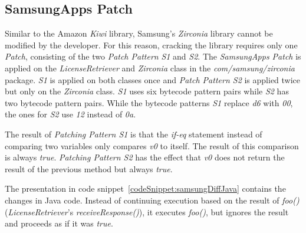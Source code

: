 \subsection{SamsungApps Patch}
Similar to the Amazon \textit{Kiwi} library, Samsung's \textit{Zirconia} library cannot be modified by the developer.
For this reason, cracking the library requires only one \textit{Patch}, consisting of the two \textit{Patch Pattern} \textit{S1} and \textit{S2}.
The \textit{SamsungApps Patch} is applied on the \textit{LicenseRetriever} and \textit{Zirconia} class in the \textit{com/samsung/zirconia} package.
\textit{S1} is applied on both classes once and \textit{Patch Pattern S2} is applied twice but only on the \textit{Zirconia} class.
\newline
\textit{S1} uses six bytecode pattern pairs while \textit{S2} has two bytecode pattern pairs.
While the bytecode patterns \textit{S1} replace \textit{d6} with \textit{00}, the ones for \textit{S2} use \textit{12} instead of \textit{0a}.
\newline


The result of \textit{Patching Pattern S1} is that the \textit{if-eq} statement instead of comparing two variables only compares \textit{v0} to itself.
The result of this comparison is always \textit{true}.
\newline
\textit{Patching Pattern S2} has the effect that \textit{v0} does not return the result of the previous method but always \textit{true}.
\newline

The presentation in code snippet~\ref{codeSnippet:samsungDiffJava} contains the changes in Java code.
Instead of continuing execution based on the result of \textit{foo()} (\textit{LicenseRetriever}'s \textit{receiveResponse()}), it executes \textit{foo()}, but ignores the result and proceeds as if it was \textit{true}.
